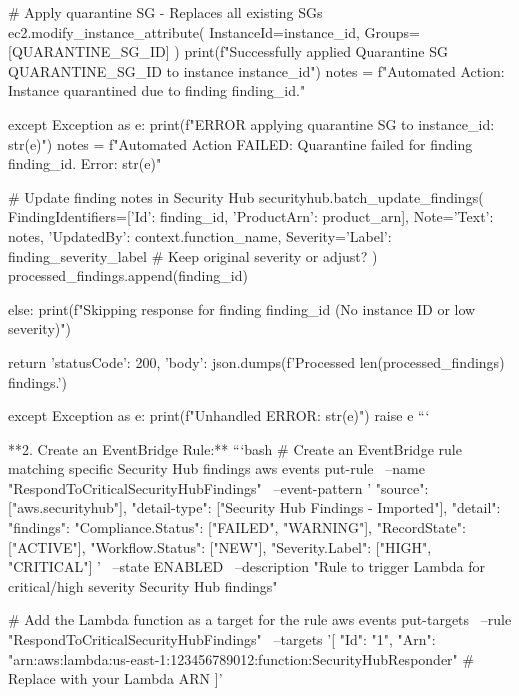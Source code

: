 \documentclass{article}
\begin{document}
                         # Apply quarantine SG - Replaces all existing SGs
                         ec2.modify_instance_attribute(
                             InstanceId=instance_id,
                             Groups=[QUARANTINE_SG_ID]
                         )
                         print(f"Successfully applied Quarantine SG {QUARANTINE_SG_ID} to instance {instance_id}")
                         notes = f"Automated Action: Instance quarantined due to finding {finding_id}."

                     except Exception as e:
                         print(f"ERROR applying quarantine SG to {instance_id}: {str(e)}")
                         notes = f"Automated Action FAILED: Quarantine failed for finding {finding_id}. Error: {str(e)}"

                     # Update finding notes in Security Hub
                     securityhub.batch_update_findings(
                         FindingIdentifiers=[{'Id': finding_id, 'ProductArn': product_arn}],
                         Note={'Text': notes, 'UpdatedBy': context.function_name},
                         Severity={'Label': finding_severity_label} # Keep original severity or adjust?
                     )
                     processed_findings.append(finding_id)

                 else:
                     print(f"Skipping response for finding {finding_id} (No instance ID or low severity)")


             return {
                 'statusCode': 200,
                 'body': json.dumps(f'Processed {len(processed_findings)} findings.')
             }

         except Exception as e:
             print(f"Unhandled ERROR: {str(e)}")
             raise e
     ```

**2. Create an EventBridge Rule:**
```bash
# Create an EventBridge rule matching specific Security Hub findings
aws events put-rule \
    --name "RespondToCriticalSecurityHubFindings" \
    --event-pattern '{
      "source": ["aws.securityhub"],
      "detail-type": ["Security Hub Findings - Imported"],
      "detail": {
        "findings": {
          "Compliance.Status": ["FAILED", "WARNING"],
          "RecordState": ["ACTIVE"],
          "Workflow.Status": ["NEW"],
          "Severity.Label": ["HIGH", "CRITICAL"]
        }
      }
    }' \
    --state ENABLED \
    --description "Rule to trigger Lambda for critical/high severity Security Hub findings"

# Add the Lambda function as a target for the rule
aws events put-targets \
    --rule "RespondToCriticalSecurityHubFindings" \
    --targets '[{
        "Id": "1",
        "Arn": "arn:aws:lambda:us-east-1:123456789012:function:SecurityHubResponder" # Replace with your Lambda ARN
      }]'
\end{document}
